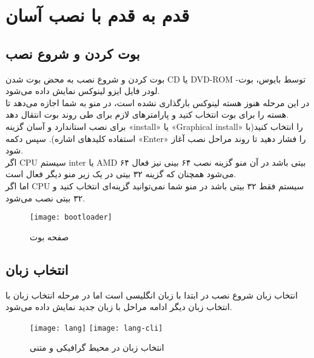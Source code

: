 \section{قدم به قدم با نصب آسان}
\subsection{بوت کردن و شروع نصب}
\begin{frame}{بوت کردن و شروع نصب}
  به محض بوت شدن CD یا DVD-ROM توسط بایوس، بوت-لودر فایل ایزو لینوکس نمایش داده می‌شود.\\
  در این مرحله هنوز هسته لینوکس بارگذاری نشده است، در منو به شما اجازه می‌دهد تا هسته را برای بوت انتخاب کنید و پارامترهای لازم برای طی روند بوت انتقال دهد.\\
  برای نصب استاندارد و آسان گزینه «install» یا «Graphical install» را انتخاب کنید(با استفاده کلید‌های اشاره). سپس دکمه «Enter» را فشار دهید تا روند مراحل نصب آغاز شود.\\
  اگر CPU سیستم inter یا AMD ۶۴ بیتی باشد در آن منو گزینه نصب ۶۴ بینی نیز فعال می‌شود همچنان که گزینه ۳۲ بیتی در یک زیر منو دیگر فعال است.\\
  اما اگر CPU سیستم فقط ۳۲ بیتی باشد در منو شما نمی‌توانید گزینه‌ای انتخاب کنید و ۳۲ بیتی نصب می‌شود.\\
\begin{figure}
    \centering
    \texttt{[image: bootloader]}
    \caption{صفحه بوت~\cite{fig:deb_bootscreen}}
\end{figure}
\end{frame}

\subsection{انتخاب زبان}
\begin{frame}{انتخاب زبان}
  شروع نصب در ابتدا با زبان انگلیسی است اما در مرحله انتخاب زبان با انتخاب زبان دیگر ادامه مراحل با زبان جدید نمایش داده می‌شود.\\
  \begin{figure}
    \texttt{[image: lang]}
    \texttt{[image: lang-cli]}
    \caption{انتخاب زبان در محیط گرافیکی و متنی~\cite{fig:deb_lang_gui}}
  \end{figure}
\end{frame}

